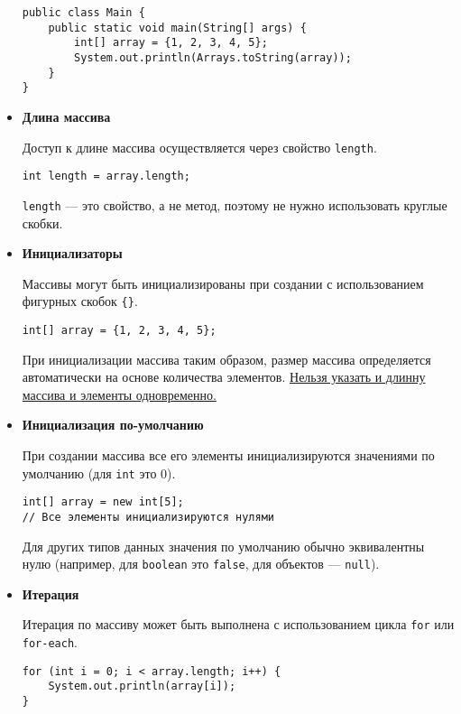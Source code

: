 \begin{itemize}
\begin{verbatim}
public class Main {
    public static void main(String[] args) {
        int[] array = {1, 2, 3, 4, 5};
        System.out.println(Arrays.toString(array));
    }
}
    \end{verbatim}
    
    \item \textbf{Длина массива}\par
    Доступ к длине массива осуществляется через свойство \texttt{length}.
    \begin{verbatim}
int length = array.length;
    \end{verbatim}
    \texttt{length} — это свойство, а не метод, поэтому не нужно использовать круглые скобки.
    
    \item \textbf{Инициализаторы}\par
    Массивы могут быть инициализированы при создании с использованием фигурных скобок \texttt{\{\}}.
    \begin{verbatim}
int[] array = {1, 2, 3, 4, 5};
    \end{verbatim}
    При инициализации массива таким образом, размер массива определяется автоматически на основе количества элементов.\newline
    \underline{Нельзя указать и длинну массива и элементы одновременно.}
    
    \item \textbf{Инициализация по-умолчанию}\par
    При создании массива все его элементы инициализируются значениями по умолчанию (для \texttt{int} это 0).
    \begin{verbatim}
int[] array = new int[5]; 
// Все элементы инициализируются нулями
    \end{verbatim}
    Для других типов данных значения по умолчанию обычно эквивалентны нулю (например, для \texttt{boolean} это \texttt{false}, для объектов — \texttt{null}).
    
    \item \textbf{Итерация}\par
    Итерация по массиву может быть выполнена с использованием цикла \texttt{for} или \texttt{for-each}.
    \begin{verbatim}
for (int i = 0; i < array.length; i++) {
    System.out.println(array[i]);
}


\end{verbatim}
\end{itemize}
